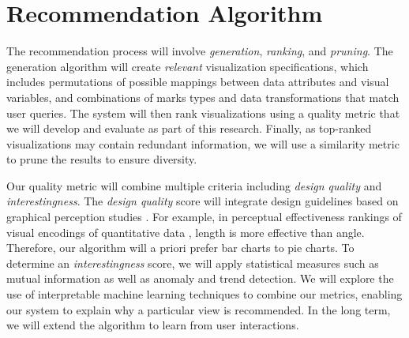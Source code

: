 \section*{Recommendation Algorithm}

The recommendation process will involve \textit{generation}, \textit{ranking}, and \textit{pruning}.
The generation algorithm will create \textit{relevant} visualization specifications,
which includes permutations of possible mappings between data attributes and visual variables,
and combinations of marks types and data transformations that match user queries.
The system will then rank visualizations using a quality metric that we will develop and evaluate as part of this research.
Finally, as top-ranked visualizations may contain redundant information, we will use a similarity metric to prune the results to ensure diversity.

Our quality metric will combine multiple criteria including \textit{design quality} and \textit{interestingness}. The \textit{design quality} score will integrate design guidelines based on graphical perception studies \cite{cleveland:perception}.  For example, in perceptual effectiveness rankings of visual encodings of quantitative data \cite{mackinlay:apt}, length is more effective than angle.  Therefore, our algorithm will a priori prefer bar charts to pie charts.  To determine an \textit{interestingness} score, we will apply statistical measures such as mutual information\cite{wang:maximum} as well as anomaly and trend detection\cite{chandola:anomaly}. We will explore the use of interpretable machine learning techniques \cite{letham:interpretable} to combine our metrics, enabling our system to explain why a particular view is recommended. In the long term, we will extend the algorithm to learn from user interactions.